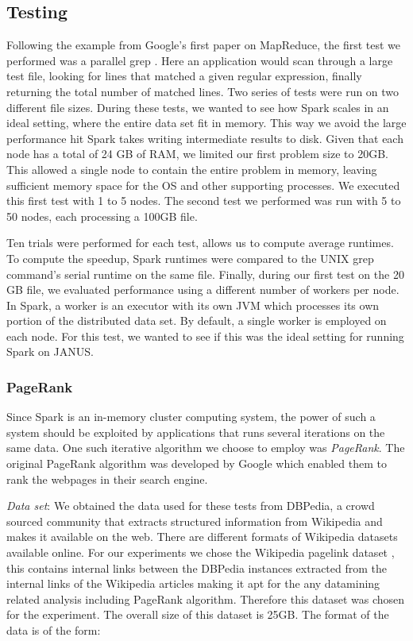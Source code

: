 \documentclass{article}
\begin{document}
\subsection{Testing}
Following the example from Google's first paper on MapReduce, the first test we
performed was a parallel grep \citep{dean-mapreduce}. Here an application would
scan through a large test file, looking for lines that matched a given regular
expression, finally returning the total number of matched lines. Two series of
tests were run on two different file sizes. During these tests, we wanted to
see how Spark scales in an ideal setting, where the entire data set fit in
memory. This way we avoid the large performance hit Spark takes writing
intermediate results to disk. Given that each node has a total of 24 GB of RAM,
we limited our first problem size to 20GB. This allowed a single node to
contain the entire problem in memory, leaving sufficient memory space for the
OS and other supporting processes. We executed this first test with 1 to 5
nodes. The second test we performed was run with 5 to 50 nodes, each processing
a 100GB file.

Ten trials were performed for each test, allows us to compute average
runtimes. To compute the speedup, Spark runtimes were compared to the UNIX grep
command's serial runtime on the same file. Finally, during our first test on the
20 GB file, we evaluated performance using a different number of workers per
node. In Spark, a worker is an executor with its own JVM which processes its
own portion of the distributed data set. By default, a single worker is
employed on each node. For this test, we wanted to see if this was the ideal
setting for running Spark on JANUS.


\subsubsection{PageRank}   
Since Spark is an in-memory cluster computing system, the power of such
a system should be exploited by applications that runs several iterations on
the same data.  One such iterative algorithm we choose to employ was
\emph{PageRank}.  The original PageRank algorithm was developed by Google which
enabled them to rank the webpages in their search engine.

\emph{Data set}:
We obtained the data used for these tests from DBPedia, a crowd sourced
community that extracts structured information from Wikipedia and makes it
available on the web. \citep{[??]} There are different formats of Wikipedia
datasets available online. For our experiments we chose the Wikipedia pagelink
dataset \citep{[??]} , this contains internal links between the DBPedia
instances extracted from the internal links of the Wikipedia articles making it
apt for the any datamining related analysis including PageRank algorithm.
Therefore this dataset was chosen for the experiment.  The overall size of this
dataset is 25GB.  The format of the data is of the form: \\
\end{document}
